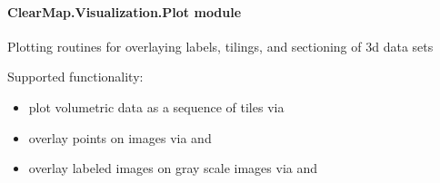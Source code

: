 \documentclass[letterpaper,10pt,english]{sphinxmanual}
\begin{document}
\paragraph{ClearMap.Visualization.Plot module}
\label{api/ClearMap.Visualization:module-ClearMap.Visualization.Plot}\label{api/ClearMap.Visualization:clearmap-visualization-plot-module}
Plotting routines for overlaying labels, tilings, and sectioning of 3d data sets

Supported functionality:
\begin{itemize}
\item {} 
plot volumetric data as a sequence of tiles via {\hyperref[api/ClearMap.Visualization:ClearMap.Visualization.Plot.plotTiling]{\emph{}}}

\item {} 
overlay points on images via {\hyperref[api/ClearMap.Visualization:ClearMap.Visualization.Plot.overlayPoints]{\emph{}}} and
{\hyperref[api/ClearMap.Visualization:ClearMap.Visualization.Plot.plotOverlayPoints]{\emph{}}}

\item {} 
overlay labeled images on gray scale images via {\hyperref[api/ClearMap.Visualization:ClearMap.Visualization.Plot.overlayLabel]{\emph{}}} and
{\hyperref[api/ClearMap.Visualization:ClearMap.Visualization.Plot.plotOverlayLabel]{\emph{}}}

\end{itemize}
\end{document}
